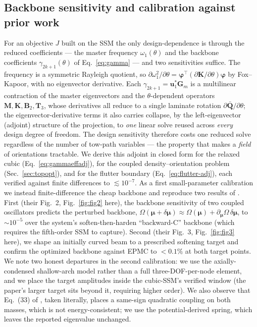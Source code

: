 \documentclass[11pt]{article}
\newcommand{\Om}{\Omega}
\begin{document}
\subsection{Backbone sensitivity and calibration against prior work}
For an objective $J$ built on the SSM the only design-dependence is through the reduced
coefficients --- the master frequency $\omega_1(\theta)$ and the backbone coefficients
$\gamma_{2k+1}(\theta)$ of Eq.~\eqref{eq:gamma} --- and two sensitivities suffice. The
frequency is a symmetric Rayleigh quotient, so $\partial\omega_1^2/\partial\theta
=\bm\varphi^{\!\top}(\partial\bm K/\partial\theta)\bm\varphi$ by Fox--Kapoor, with no
eigenvector derivative. Each $\gamma_{2k+1}=\bm u_1^{*}\bm G_m$ is a multilinear
contraction of the master eigenvectors and the $\theta$-dependent operators
$\bm M,\bm K,\bm B_2,\bm T_3$, whose derivatives all reduce to a single laminate rotation
$\partial\bar{\bm Q}/\partial\theta$; the eigenvector-derivative terms it also carries
collapse, by the left-eigenvector (adjoint) structure of the projection, to \emph{one}
linear solve reused across \emph{every} design degree of freedom. The design sensitivity
therefore costs one reduced solve regardless of the number of tow-path variables --- the
property that makes a \emph{field} of orientations tractable. We derive this adjoint in
closed form for the relaxed cubic (Eq.~\eqref{eq:gammaeffadj}), for the coupled
density--orientation problem (Sec.~\ref{sec:topopt}), and for the flutter boundary
(Eq.~\eqref{eq:flutter-adj}), each verified against finite differences to
$\lesssim\!10^{-7}$. As a first small-parameter calibration we instead finite-difference
the cheap backbone and reproduce two results of \cite{pozzi2025,li2024}. First
(their Fig.~2, Fig.~\ref{fig:fig2} here), the backbone sensitivity of two coupled
oscillators predicts the perturbed backbone, $\Om(\bm\mu+\delta\bm\mu)\approx
\Om(\bm\mu)+\partial_{\bm\mu}\Om\,\delta\bm\mu$, to $\sim\!10^{-5}$ over the
system's soften-then-harden ``backward-C'' backbone (which requires the
fifth-order SSM to capture). Second (their Fig.~3, Fig.~\ref{fig:fig3} here), we
shape an initially curved beam to a prescribed softening target and confirm the
optimized backbone against EPMC to $<0.1\%$ at both target points.
We note two honest departures in the second calibration: we use the
axially-condensed shallow-arch model rather than a full three-DOF-per-node
element, and we place the target amplitudes inside the cubic-SSM's verified
window (the paper's larger target sits beyond it, requiring higher order). We
also observe that Eq.~(33) of \cite{pozzi2025}, taken literally, places a
same-sign quadratic coupling on both masses, which is not energy-consistent; we
use the potential-derived spring, which leaves the reported eigenvalue unchanged.
\end{document}
